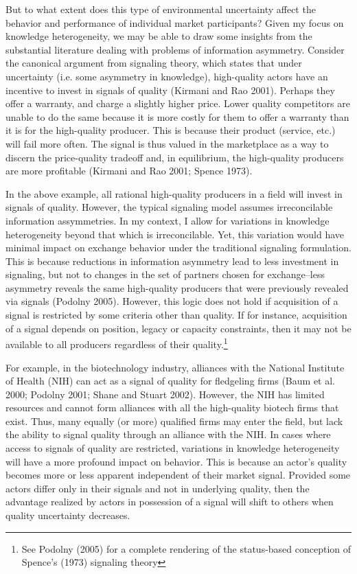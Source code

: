 But to what extent does this type of environmental uncertainty affect the behavior and performance of individual market participants? Given my focus on knowledge heterogeneity, we may be able to draw some insights from the substantial literature dealing with problems of information asymmetry. Consider the canonical argument from signaling theory, which states that under uncertainty (i.e. some asymmetry in knowledge), high-quality actors have an incentive to invest in signals of quality (Kirmani and Rao 2001). Perhaps they offer a warranty, and charge a slightly higher price. Lower quality competitors are unable to do the same because it is more costly for them to offer a warranty than it is for the high-quality producer. This is because their product (service, etc.) will fail more often. The signal is thus valued in the marketplace as a way to discern the price-quality tradeoff and, in equilibrium, the high-quality producers are more profitable (Kirmani and Rao 2001; Spence 1973).

In the above example, all rational high-quality producers in a field will invest in signals of quality. However, the typical signaling model assumes irreconcilable information assymmetries. In my context, I allow for variations in knowledge heterogeneity beyond that which is irreconcilable. Yet, this variation would have minimal impact on exchange behavior under the traditional signaling formulation. This is because reductions in information asymmetry lead to less investment in signaling, but not to changes in the set of partners chosen for exchange--less asymmetry reveals the same high-quality producers that were previously revealed via signals (Podolny 2005). However, this logic does not hold if acquisition of a signal is restricted by some criteria other than quality. If for instance, acquisition of a signal depends on position, legacy or capacity constraints, then it may not be available to all producers regardless of their quality.\footnote{See Podolny (2005) for a complete rendering of the status-based conception of Spence's (1973) signaling theory}

For example, in the biotechnology industry, alliances with the National Institute of Health (NIH) can act as a signal of quality for fledgeling firms (Baum et al. 2000; Podolny 2001; Shane and Stuart 2002). However, the NIH has limited resources and cannot form alliances with all the high-quality biotech firms that exist. Thus, many equally (or more) qualified firms may enter the field, but lack the ability to signal quality through an alliance with the NIH. In cases where access to signals of quality are restricted, variations in knowledge heterogeneity will have a more profound impact on behavior. This is because an actor's quality becomes more or less apparent independent of their market signal. Provided some actors differ only in their signals and not in underlying quality, then the advantage realized by actors in possession of a signal will shift to others when quality uncertainty decreases.

